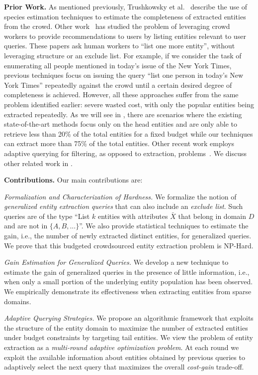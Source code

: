 \noindent
{\bf Prior Work.} As mentioned previously, Trushkowsky et al.~\cite{trushkowsky:2013,DBLP:journals/cacm/TrushkowskyKS16}
describe the use of species estimation techniques to estimate the completeness of extracted entities from the crowd. 
Other work~\cite{amsterdamer:2014} has studied the problem of leveraging crowd workers to provide recommendations to users by listing entities relevant to user queries. These papers ask human workers to ``list one more entity'', without leveraging structure or an exclude list. For example, if we consider the task of enumerating all people mentioned in today's issue of the New York Times, previous techniques focus on issuing the query ``list one person in today's New York Times'' repeatedly against the crowd until a certain desired degree of completeness is achieved.
However, all these approaches suffer from the same problem identified earlier: severe wasted cost,
with only the popular entities being extracted repeatedly. As we will see in , there are scenarios where the existing state-of-the-art methods focus only on the head entities and are only able to retrieve less than 20\% of the total entities for a fixed budget while our techniques can extract more than 75\% of the total entities.
Other recent work employs adaptive querying for filtering, as opposed to  extraction, problems~\cite{DBLP:conf/hcomp/LanRST17}.
We discuss other related work in .

\noindent
{\bf Contributions.} Our main contributions are:
\squishlist
\item {\em Formalization and Characterization of Hardness.} We formalize the notion of {\em generalized entity extraction queries} that can also include an {\em exclude list}. Such queries are of the type ``List $k$ entities with attributes $\bar{X}$ that belong in domain $D$ and are not in $\{A, B, ...\}$''. We also provide statistical techniques to estimate the gain, i.e., the number of newly extracted distinct entities, for generalized queries. We prove that this budgeted crowdsourced entity extraction problem is NP-Hard. 
\item {\em Gain Estimation for Generalized Queries.}  We develop a new technique to estimate the gain of generalized queries in the presence of little information, i.e., when only a small portion of the underlying entity population has been observed. We empirically demonstrate its effectiveness when extracting entities from sparse domains.
\item {\em Adaptive Querying Strategies.} We propose an algorithmic framework that exploits the structure of the entity domain to maximize the number of extracted entities under budget constraints by targeting tail entities. We view the problem of entity extraction as a {\em multi-round adaptive optimization problem}. At  each round we exploit the available information about entities obtained by previous queries to adaptively select the next query that maximizes the overall {\em cost-gain} trade-off.
\squishend

